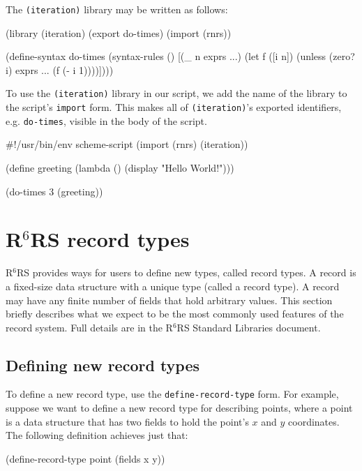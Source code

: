 \documentclass[onecolumn, 12pt, twoside, openright, dvipdfm]{book}
\newcommand{\rnrs}[1]{R$^{\mathrm{#1}}$RS}
\begin{document}
The \texttt{(iteration)} library may be written as follows:

\begin{CodeInline}
(library (iteration)
  (export do-times)
  (import (rnrs))

  (define-syntax do-times
    (syntax-rules ()
      [(_ n exprs ...)
       (let f ([i n])
         (unless (zero? i)
           exprs ...
           (f (- i 1))))])))
\end{CodeInline}

To use the \texttt{(iteration)} library in our script, we add the
name of the library to the script's \texttt{import} form.  This
makes all of \texttt{(iteration)}'s exported identifiers, e.g.
\texttt{do-times},  visible in the body of the script.

\begin{CodeInline}
#!/usr/bin/env scheme-script
(import (rnrs) (iteration))

(define greeting
  (lambda ()
    (display "Hello World!\n")))

(do-times 3 (greeting))
\end{CodeInline}

\section{\rnrs{6} record types}

\rnrs{6} provides ways for users to define new types, called record
types.  A record is a fixed-size data structure with a unique type
(called a record type).  A record may have any finite number of
fields that hold arbitrary values.  This section briefly describes
what we expect to be the most commonly used features of the record
system.  Full details are in the \rnrs{6} Standard Libraries
document\cite{r6rs:lib}.

\subsection{Defining new record types}

To define a new record type,  use the \texttt{define-record-type}
form.  For example, suppose we want to define a new record type for
describing points, where a point is a data structure that has two
fields to hold the point's $x$ and $y$ coordinates.  The following
definition achieves just that:

\begin{CodeInline}
(define-record-type point
  (fields x y))
\end{CodeInline}
\end{document}
